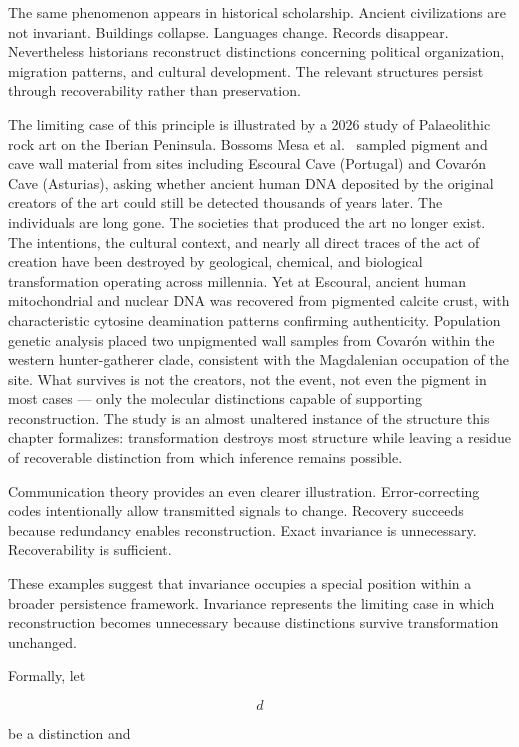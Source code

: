 \documentclass[12pt,oneside]{article}
\theoremstyle{definition}
\begin{document}
The same phenomenon appears in historical scholarship. Ancient civilizations are not invariant. Buildings collapse. Languages change. Records disappear. Nevertheless historians reconstruct distinctions concerning political organization, migration patterns, and cultural development. The relevant structures persist through recoverability rather than preservation.

The limiting case of this principle is illustrated by a 2026 study of Palaeolithic rock art on the Iberian Peninsula. Bossoms Mesa et al.~\cite{bossomsmesa2026} sampled pigment and cave wall material from sites including Escoural Cave (Portugal) and Covarón Cave (Asturias), asking whether ancient human DNA deposited by the original creators of the art could still be detected thousands of years later. The individuals are long gone. The societies that produced the art no longer exist. The intentions, the cultural context, and nearly all direct traces of the act of creation have been destroyed by geological, chemical, and biological transformation operating across millennia. Yet at Escoural, ancient human mitochondrial and nuclear DNA was recovered from pigmented calcite crust, with characteristic cytosine deamination patterns confirming authenticity. Population genetic analysis placed two unpigmented wall samples from Covarón within the western hunter-gatherer clade, consistent with the Magdalenian occupation of the site. What survives is not the creators, not the event, not even the pigment in most cases --- only the molecular distinctions capable of supporting reconstruction. The study is an almost unaltered instance of the structure this chapter formalizes: transformation destroys most structure while leaving a residue of recoverable distinction from which inference remains possible.

Communication theory provides an even clearer illustration. Error-correcting codes intentionally allow transmitted signals to change. Recovery succeeds because redundancy enables reconstruction. Exact invariance is unnecessary. Recoverability is sufficient.

These examples suggest that invariance occupies a special position within a broader persistence framework. Invariance represents the limiting case in which reconstruction becomes unnecessary because distinctions survive transformation unchanged.

Formally, let

\[
d
\]

be a distinction and
\end{document}
